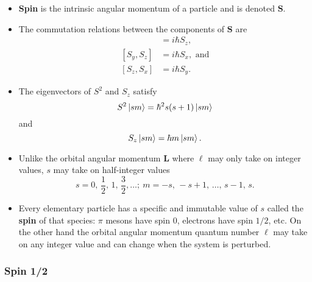 \documentclass{article}
\renewcommand{\vec}[1]{\boldsymbol{\mathbf{#1}}}
\begin{document}
\begin{itemize}
  \item \textbf{Spin} is the intrinsic angular momentum of a particle and is denoted $\vec{S}$.

  \item The commutation relations between the components of $\vec{S}$ are \begin{align*}
          [S_x, S_y] & = i \hbar S_z,             \\
          [S_y, S_z] & = i \hbar S_x, \text{ and} \\
          [S_z, S_x] & = i \hbar S_y.
        \end{align*}

  \item The eigenvectors of $S^2$ and $S_z$ satisfy \[S^2 \ket{s m} = \hbar^2 s (s + 1) \ket{s m}\] and \[S_z \ket{s m} = \hbar m \ket{s m}.\]

  \item Unlike the orbital angular momentum $\vec{L}$ where $\ell$ may only take on integer values, $s$ may take on half-integer values \[s = 0, \,\frac{1}{2}, \,1, \,\frac{3}{2}, \ldots; \ m = -s, \,-s + 1, \,\ldots, \,s - 1, \,s.\]

  \item Every elementary particle has a specific and immutable value of $s$ called the \textbf{spin} of that species: $\pi$ mesons have spin 0, electrons have spin $1 / 2$, etc. On the other hand the orbital angular momentum quantum number $\ell$ may take on any integer value and can change when the system is perturbed.
\end{itemize}

\subsubsection{Spin 1/2}
\end{document}
